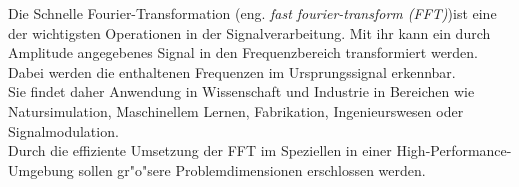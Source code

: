 
Die Schnelle Fourier-Transformation (eng. \textit{fast fourier-transform (FFT)})ist eine der wichtigsten Operationen in der Signalverarbeitung. Mit ihr kann ein durch Amplitude angegebenes Signal in den Frequenzbereich transformiert werden. Dabei werden die enthaltenen Frequenzen im Ursprungssignal erkennbar.\\
Sie findet daher Anwendung in Wissenschaft und Industrie in Bereichen wie Natursimulation, Maschinellem Lernen, Fabrikation, Ingenieurswesen oder Signalmodulation.\\
Durch die effiziente Umsetzung der FFT im Speziellen in einer High-Performance-Umgebung sollen gr"o"sere Problemdimensionen erschlossen werden.\\

